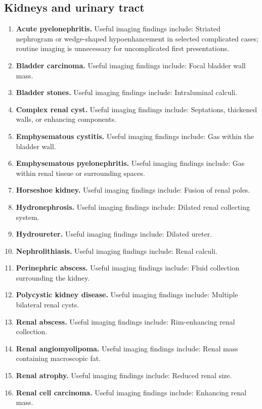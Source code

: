 \subsection{Kidneys and urinary tract}
\begin{enumerate}[leftmargin=*,itemsep=0.45em,topsep=0.4em]
\item \textbf{Acute pyelonephritis.} Useful imaging findings include: Striated nephrogram or wedge-shaped hypoenhancement in selected complicated cases; routine imaging is unnecessary for uncomplicated first presentations.
\item \textbf{Bladder carcinoma.} Useful imaging findings include: Focal bladder wall mass.
\item \textbf{Bladder stones.} Useful imaging findings include: Intraluminal calculi.
\item \textbf{Complex renal cyst.} Useful imaging findings include: Septations, thickened walls, or enhancing components.
\item \textbf{Emphysematous cystitis.} Useful imaging findings include: Gas within the bladder wall.
\item \textbf{Emphysematous pyelonephritis.} Useful imaging findings include: Gas within renal tissue or surrounding spaces.
\item \textbf{Horseshoe kidney.} Useful imaging findings include: Fusion of renal poles.
\item \textbf{Hydronephrosis.} Useful imaging findings include: Dilated renal collecting system.
\item \textbf{Hydroureter.} Useful imaging findings include: Dilated ureter.
\item \textbf{Nephrolithiasis.} Useful imaging findings include: Renal calculi.
\item \textbf{Perinephric abscess.} Useful imaging findings include: Fluid collection surrounding the kidney.
\item \textbf{Polycystic kidney disease.} Useful imaging findings include: Multiple bilateral renal cysts.
\item \textbf{Renal abscess.} Useful imaging findings include: Rim-enhancing renal collection.
\item \textbf{Renal angiomyolipoma.} Useful imaging findings include: Renal mass containing macroscopic fat.
\item \textbf{Renal atrophy.} Useful imaging findings include: Reduced renal size.
\item \textbf{Renal cell carcinoma.} Useful imaging findings include: Enhancing renal mass.

\end{enumerate}
